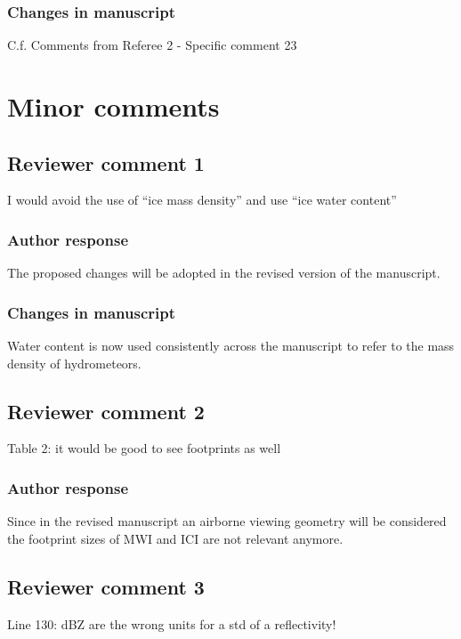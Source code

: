 \subsubsection*{Changes in manuscript}

C.f. Comments from Referee 2 - Specific comment 23

\section{Minor comments}

\subsection*{Reviewer comment 1}
I would avoid the use of “ice mass density” and use “ice water content”

\subsubsection*{Author response}

The proposed changes will be adopted in the revised version of the manuscript.

\subsubsection*{Changes in manuscript}

Water content is now used consistently across the manuscript to refer to the mass
density of hydrometeors.

\subsection*{Reviewer comment 2}

Table 2:  it would be good to see footprints as well

\subsubsection*{Author response}

Since in the revised manuscript an airborne viewing geometry will be considered
the footprint sizes of MWI and ICI are not relevant anymore.

\subsection*{Reviewer comment 3}

Line 130: dBZ are the wrong units for a std of a reflectivity!

